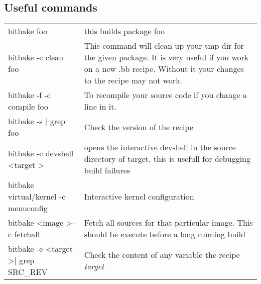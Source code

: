 \documentclass[10pt,a4paper,landscape]{article}
\begin{document}
\begin{multicols}{2}
\section{Useful commands}
\begin{tabular}{p{5cm}p{\linewidth - 5.9cm}}
bitbake foo & this builds package foo \\
bitbake -c clean foo & This command will clean up your tmp dir for the given package. It is very useful if you work on a new .bb recipe. Without it your changes to the recipe may not work. \\
bitbake -f -c compile foo & To recompile your source code if you change a line in it. \\
bitbake -s | grep foo & Check the version of the recipe \\
bitbake -c devshell \textless target \textgreater &  opens the interactive devshell in the source directory of target, this is usefull for debugging build failures \\
bitbake virtual/kernel -c menuconfig & Interactive kernel configuration \\
bitbake \textless image \textgreater -c fetchall & Fetch all sources for that particular image. This should be execute before a long running build \\
bitbake -e \textless target \textgreater | grep SRC\_REV & Check the content of any variable the recipe \textit{target}\\


\end{tabular}


\end{multicols}
\end{document}
